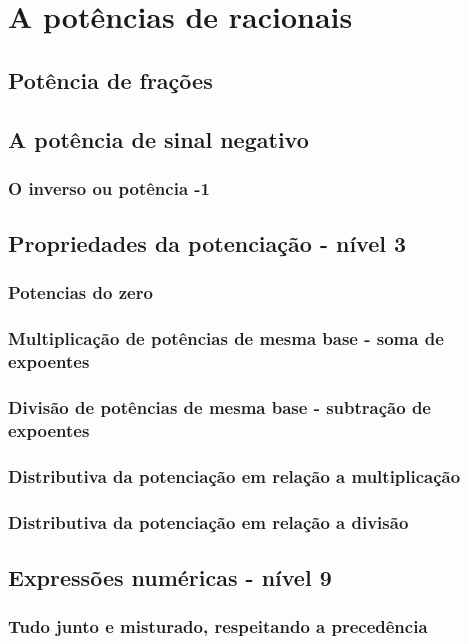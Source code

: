 \chapter[A potências de racionais]{A potências de racionais}

\section{Potência de frações}

\section{A potência de sinal negativo}

\subsection{O inverso ou potência -1}

\section{Propriedades da potenciação - nível 3}

\subsection{Potencias do zero}

\subsection{Multiplicação de potências de mesma base - soma de expoentes}

\subsection{Divisão de potências de mesma base - subtração de expoentes}

\subsection{Distributiva da potenciação em relação a multiplicação}

\subsection{Distributiva da potenciação em relação a divisão}

\section{Expressões numéricas - nível 9}

\subsection{Tudo junto e misturado, respeitando a precedência}